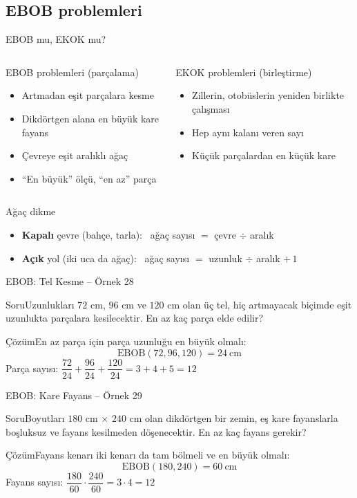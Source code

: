 \documentclass[aspectratio=169,11pt,handout]{beamer}
\newcommand{\soru}[3]{%
\begin{frame}{#1}
  \begin{block}{Soru}\large #2\end{block}
  \pause
  \begin{exampleblock}{Çözüm}\large #3\end{exampleblock}
\end{frame}}
\begin{document}
\subsection{EBOB problemleri}
\begin{frame}{EBOB mu, EKOK mu?}
\begin{columns}[t]
\begin{block}{EBOB problemleri (parçalama)}
\begin{itemize}
\item Artmadan eşit parçalara kesme
\item Dikdörtgen alana en büyük kare fayans
\item Çevreye eşit aralıklı ağaç
\item ``En büyük'' ölçü, ``en az'' parça
\end{itemize}
\end{block}
\begin{block}{EKOK problemleri (birleştirme)}
\begin{itemize}
\item Zillerin, otobüslerin yeniden birlikte çalışması
\item Hep aynı kalanı veren sayı
\item Küçük parçalardan en küçük kare
\end{itemize}
\end{block}
\end{columns}
\begin{alertblock}{Ağaç dikme}
\begin{itemize}
\item \textbf{Kapalı} çevre (bahçe, tarla): \ ağaç sayısı \(=\) çevre \(\div\) aralık
\item \textbf{Açık} yol (iki uca da ağaç): \ ağaç sayısı \(=\) uzunluk \(\div\) aralık \(+\,1\)
\end{itemize}
\end{alertblock}
\end{frame}

\soru{EBOB: Tel Kesme -- Örnek 28}
{Uzunlukları \(72\) cm, \(96\) cm ve \(120\) cm olan üç tel, hiç artmayacak biçimde eşit uzunlukta parçalara kesilecektir. En az kaç parça elde edilir?}
{En az parça için parça uzunluğu en büyük olmalı:
\[\text{EBOB}(72,96,120)=24\ \text{cm}\]
Parça sayısı: \(\dfrac{72}{24}+\dfrac{96}{24}+\dfrac{120}{24}=3+4+5=12\)}

\soru{EBOB: Kare Fayans -- Örnek 29}
{Boyutları \(180\) cm \(\times\) \(240\) cm olan dikdörtgen bir zemin, eş kare fayanslarla boşluksuz ve fayans kesilmeden döşenecektir. En az kaç fayans gerekir?}
{Fayans kenarı iki kenarı da tam bölmeli ve en büyük olmalı:
\[\text{EBOB}(180,240)=60\ \text{cm}\]
Fayans sayısı: \(\dfrac{180}{60}\cdot\dfrac{240}{60}=3\cdot 4=12\)}
\end{document}
